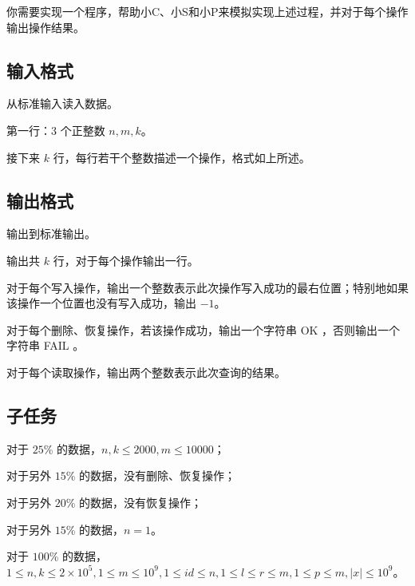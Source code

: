 你需要实现一个程序，帮助小C、小S和小P来模拟实现上述过程，并对于每个操作输出操作结果。

\subsection*{输入格式}

从标准输入读入数据。

第一行：$3$ 个正整数 $n,m,k$。

接下来 $k$ 行，每行若干个整数描述一个操作，格式如上所述。

\subsection*{输出格式}

输出到标准输出。

输出共 $k$ 行，对于每个操作输出一行。

对于每个写入操作，输出一个整数表示此次操作写入成功的最右位置；特别地如果该操作一个位置也没有写入成功，输出 $-1$。

对于每个删除、恢复操作，若该操作成功，输出一个字符串 OK ，否则输出一个字符串 FAIL 。

对于每个读取操作，输出两个整数表示此次查询的结果。

\examplebox{}{}

\subsection*{子任务}

对于 $25$\% 的数据，$n,k\le 2000,m\le 10000$；

对于另外 $15$\% 的数据，没有删除、恢复操作；

对于另外 $20$\% 的数据，没有恢复操作；

对于另外 $15$\% 的数据，$n=1$。

对于 $100$\% 的数据，$1\le n,k\le 2\times 10^5,1\le m\le 10^9,1\le id\le n,1\le l\le r\le m,1\le p\le m,|x|\le 10^9$。